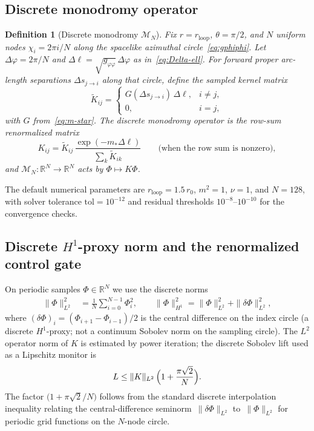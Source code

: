 \documentclass{iopjournal}
\newcommand{\MN}{\mathcal{M}_{N}}
\newtheorem{definition}[theorem]{Definition}
\theoremstyle{remark}
\begin{document}
\subsection{Discrete monodromy operator}

\begin{definition}[Discrete monodromy $\MN$]
\label{def:MN}
Fix $r=r_{\mathrm{loop}}$, $\theta=\pi/2$, and $N$ uniform nodes $\chi_{i}=2\pi i/N$ along the spacelike azimuthal circle~\eqref{eq:gphiphi}.
Let $\Delta\varphi=2\pi/N$ and $\Delta\ell=\sqrt{g_{\varphi\varphi}}\,\Delta\varphi$ as in~\eqref{eq:Delta-ell}.
For forward proper arc-length separations $\Delta s_{j\to i}$ along that circle, define the sampled kernel matrix
\begin{equation}
\label{eq:K-raw}
\widetilde{K}_{ij}
=
\begin{cases}
G(\Delta s_{j\to i})\,\Delta\ell, & i\neq j,\\
0, & i=j,
\end{cases}
\end{equation}
with $G$ from~\eqref{eq:m-star}.
The discrete monodromy operator is the \emph{row-sum renormalized} matrix
\begin{equation}
\label{eq:K-renorm}
K_{ij}
=
\widetilde{K}_{ij}\,
\frac{\exp(-m_{\ast}\Delta\ell)}{\sum_{k}\widetilde{K}_{ik}}
\qquad\bigl(\text{when the row sum is nonzero}\bigr),
\end{equation}
and $\MN:\mathbb{R}^{N}\to\mathbb{R}^{N}$ acts by $\Phi\mapsto K\Phi$.
\end{definition}

The default numerical parameters are $r_{\mathrm{loop}}=1.5\,r_{0}$, $m^{2}=1$, $\nu=1$, and $N=128$, with solver tolerance $\mathrm{tol}=10^{-12}$ and residual thresholds $10^{-8}$--$10^{-10}$ for the convergence checks.

\subsection{\texorpdfstring{Discrete $H^{1}$-proxy norm and the renormalized control gate}{Discrete H1-proxy norm and the renormalized control gate}}

On periodic samples $\Phi\in\mathbb{R}^{N}$ we use the discrete norms
\begin{align}
\label{eq:discrete-norms}
\|\Phi\|_{L^{2}}^{2}
&=
\frac1N\sum_{i=0}^{N-1}\Phi_{i}^{2},
\qquad
\|\Phi\|_{H^{1}}^{2}
=
\|\Phi\|_{L^{2}}^{2}
+
\|\delta\Phi\|_{L^{2}}^{2},
\end{align}
where $(\delta\Phi)_{i}=(\Phi_{i+1}-\Phi_{i-1})/2$ is the central difference on the index circle (a discrete $H^{1}$-proxy; not a continuum Sobolev norm on the sampling circle).
The $L^{2}$ operator norm of $K$ is estimated by power iteration; the discrete Sobolev lift used as a Lipschitz monitor is
\begin{equation}
\label{eq:discrete-sobolev}
L
\le
\|K\|_{L^{2}}\,
\Bigl(1+\frac{\pi\sqrt{2}}{N}\Bigr).
\end{equation}
The factor $\bigl(1+\pi\sqrt{2}/N\bigr)$ follows from the standard discrete interpolation inequality relating the central-difference seminorm~$\|\delta\Phi\|_{L^{2}}$ to~$\|\Phi\|_{L^{2}}$ for periodic grid functions on the $N$-node circle.
\end{document}
